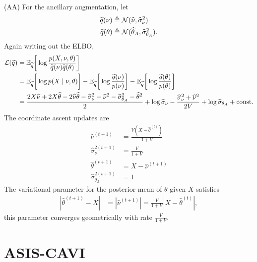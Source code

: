 \documentclass{article}
\begin{document}
 (AA) For the ancillary augmentation, let
\begin{align}
\widetilde q(\nu)
&\triangleq \mathcal{N}(\widehat{\nu},\widehat\sigma_\nu^2) \\
\widetilde q(\theta)
&\triangleq \mathcal{N}(\widehat\theta_A,\widehat\sigma_{\theta_A}^2).
\end{align}
Again writing out the ELBO,
\begin{align*}
\mathcal{L}(\widetilde q)
&=\mathbb{E}_{\widetilde q}\bigg[\log \frac{p(X,\nu,\theta)}{\widetilde q(\nu)\widetilde q(\theta)}\bigg] \\
&=  \mathbb{E}_{\widetilde q}\bigg[\log p(X\mid \nu,\theta)\bigg]
-  \mathbb{E}_{\widetilde q}\bigg[\log\frac{\widetilde q(\nu)}{p(\nu)} \bigg]
-  \mathbb{E}_{\widetilde q}\bigg[\log \frac{\widetilde q(\theta)}{p(\theta)}\bigg] \\
&=  \frac{2X\widehat\nu+2X\widehat\theta - 2\widehat\nu\widehat\theta - \widehat\sigma_\nu^2-\widehat\nu^2-\widehat\sigma_{\theta_A}^2-\widehat\theta^2}{2}
+\log\widehat\sigma_\nu - \frac{\widehat\sigma_\nu^{2} + \widehat\nu^2}{2V}
+\log \widehat{\sigma}_{\theta_A} 
+ \text{const.}
\end{align*}
The coordinate ascent updates are
\begin{align}
\widehat\nu^{(t+1)}
&= \frac{V(X - \widehat\theta^{(t)})}{1+V} \\%
\widehat\sigma^{2(t+1)}_{\nu}
&= \frac{V}{1+V} \\
\widehat\theta^{(t+1)}
&= X-\widehat\nu^{(t+1)} \\
\widehat\sigma^{2(t+1)}_{\theta_A}
&= 1
\end{align}
The variational parameter for the posterior mean of $\theta$ given $X$ satisfies
\begin{align}
\left|\widehat\theta^{(t+1)} - X\right|
&= \left|\widehat\nu^{(t+1)}\right| 
= \frac{V}{1+V}\left|X - \widehat\theta^{(t)}\right|,
\end{align}
this parameter converges geometrically with rate $\frac{V}{1+V}$. \\

\newpage

\section{ASIS-CAVI}
\end{document}
